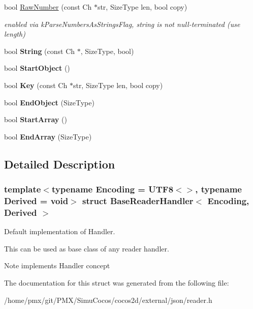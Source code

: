\begin{DoxyCompactItemize}
bool \hyperlink{structBaseReaderHandler_a9ed0d83d5e6c8f5e4b32ca3735ff0bb7}{Raw\+Number} (const Ch $\ast$str, Size\+Type len, bool copy)
\begin{DoxyCompactList}\small\item\em enabled via k\+Parse\+Numbers\+As\+Strings\+Flag, string is not null-\/terminated (use length) \end{DoxyCompactList}\item 
\mbox{\label{structBaseReaderHandler_a3ac69e6326d0aeef7b1f2619742bbe00}} 
bool {\bfseries String} (const Ch $\ast$, Size\+Type, bool)
\item 
\mbox{\label{structBaseReaderHandler_ab0a7d9bcececb8d6ed748656f67f4917}} 
bool {\bfseries Start\+Object} ()
\item 
\mbox{\label{structBaseReaderHandler_abc50b2e7e411b7b731715e05cd01e2eb}} 
bool {\bfseries Key} (const Ch $\ast$str, Size\+Type len, bool copy)
\item 
\mbox{\label{structBaseReaderHandler_a0406cee0af26bc3a0b7fb2414537b0ab}} 
bool {\bfseries End\+Object} (Size\+Type)
\item 
\mbox{\label{structBaseReaderHandler_a9dbb1143a250a904bb18a174553a3a00}} 
bool {\bfseries Start\+Array} ()
\item 
\mbox{\label{structBaseReaderHandler_ae9d60a8779b6a77a7f283d64961879fb}} 
bool {\bfseries End\+Array} (Size\+Type)
\end{DoxyCompactItemize}


\subsection{Detailed Description}
\subsubsection*{template$<$typename Encoding = U\+T\+F8$<$$>$, typename Derived = void$>$\newline
struct Base\+Reader\+Handler$<$ Encoding, Derived $>$}

Default implementation of Handler. 

This can be used as base class of any reader handler. \begin{DoxyNote}{Note}
implements Handler concept 
\end{DoxyNote}


The documentation for this struct was generated from the following file\+:\begin{DoxyCompactItemize}
\item 
/home/pmx/git/\+P\+M\+X/\+Simu\+Cocos/cocos2d/external/json/reader.\+h\end{DoxyCompactItemize}
